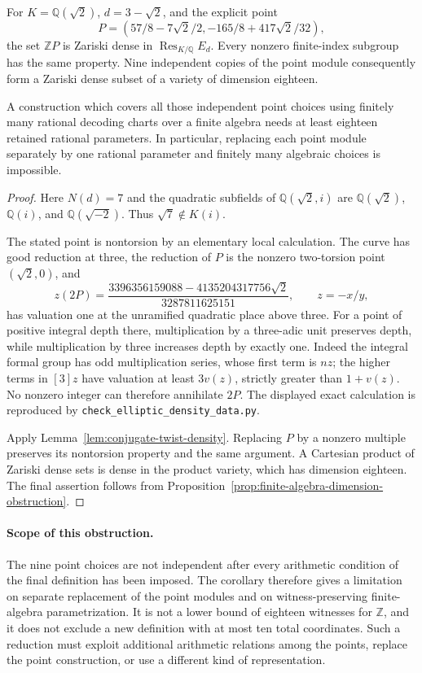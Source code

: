 \begin{corollary}
\label{cor:point-modules-dimension}
For $K=\mathbb Q(\sqrt2)$, $d=3-\sqrt2$, and the explicit
point
\[
 P=(57/8-7\sqrt2/2,-165/8+417\sqrt2/32),
\]
the set $\mathbb ZP$ is Zariski dense in
$\operatorname{Res}_{K/\mathbb Q}E_d$.  Every nonzero
finite-index subgroup has the same property.  Nine independent
copies of the point module consequently form a Zariski dense
subset of a variety of dimension eighteen.

A construction which covers all those independent point choices
using finitely many rational decoding charts over a finite
algebra needs at least eighteen retained rational parameters.
In particular, replacing each point module separately by one
rational parameter and finitely many algebraic choices is
impossible.
\end{corollary}
\begin{proof}
Here $N(d)=7$ and the quadratic subfields of
$\mathbb Q(\sqrt2,i)$ are
$\mathbb Q(\sqrt2)$, $\mathbb Q(i)$, and
$\mathbb Q(\sqrt{-2})$.  Thus $\sqrt7\notin K(i)$.

The stated point is nontorsion by an elementary local calculation.
The curve has good reduction at three, the reduction of $P$ is
the nonzero two-torsion point $(\sqrt2,0)$, and
\[
 z(2P)=
 \frac{3396356159088-4135204317756\sqrt2}{3287811625151},
 \qquad z=-x/y,
\]
has valuation one at the unramified quadratic place above three.
For a point of positive integral depth there, multiplication by
a three-adic unit preserves depth, while multiplication by three
increases depth by exactly one.  Indeed the integral formal
group has odd multiplication series, whose first term is $nz$;
the higher terms in $[3]z$ have valuation at least $3v(z)$,
strictly greater than $1+v(z)$.  No nonzero integer can therefore
annihilate $2P$.  The displayed exact calculation is reproduced
by \texttt{check\_elliptic\_density\_data.py}.

Apply Lemma~\ref{lem:conjugate-twist-density}.  Replacing $P$
by a nonzero multiple preserves its nontorsion property and
the same argument.  A Cartesian product of Zariski dense sets
is dense in the product variety, which has dimension eighteen.
The final assertion follows from
Proposition~\ref{prop:finite-algebra-dimension-obstruction}.
\end{proof}

\paragraph{Scope of this obstruction.}
The nine point choices are not independent after every arithmetic
condition of the final definition has been imposed.  The corollary
therefore gives a limitation on separate replacement of the point
modules and on witness-preserving finite-algebra parametrization.
It is not a lower bound of eighteen witnesses for $\mathbb Z$,
and it does not exclude a new definition with at most ten total
coordinates.  Such a reduction must exploit additional arithmetic
relations among the points, replace the point construction, or use
a different kind of representation.
